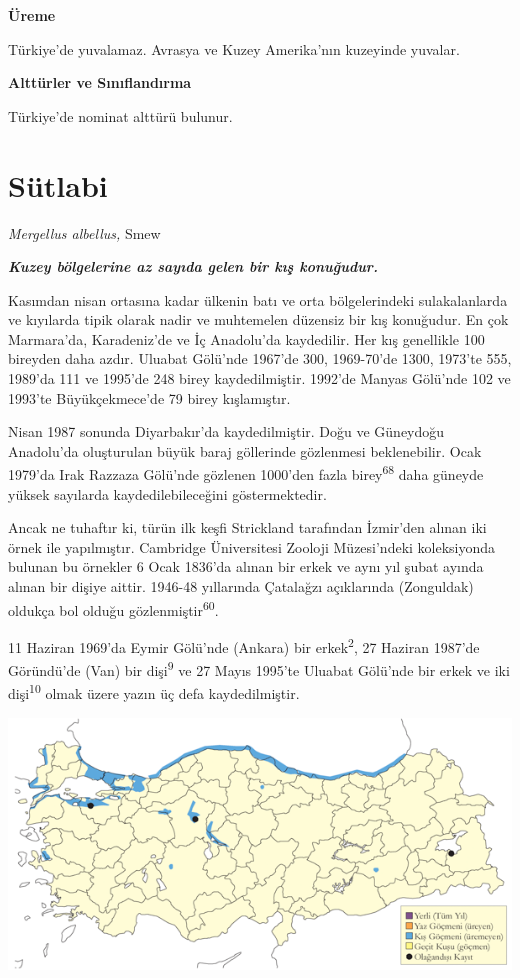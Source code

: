 \documentclass[
  letterpaper,
  DIV=11,
  numbers=noendperiod]{scrreprt}
\begin{document}
\textbf{Üreme}

Türkiye'de yuvalamaz. Avrasya ve Kuzey Amerika'nın kuzeyinde yuvalar.

\textbf{Alttürler ve Sınıflandırma}

Türkiye'de nominat alttürü bulunur.

\section{Sütlabi}\label{suxfctlabi}

\emph{Mergellus albellus,} Smew

\textbf{\emph{Kuzey bölgelerine az sayıda gelen bir kış konuğudur.}}

Kasımdan nisan ortasına kadar ülkenin batı ve orta bölgelerindeki
sulakalanlarda ve kıyılarda tipik olarak nadir ve muhtemelen düzensiz
bir kış konuğudur. En çok Marmara'da, Karadeniz'de ve İç Anadolu'da
kaydedilir. Her kış genellikle 100 bireyden daha azdır. Uluabat Gölü'nde
1967'de 300, 1969-70'de 1300, 1973'te 555, 1989'da 111 ve 1995'de 248
birey kaydedilmiştir. 1992'de Manyas Gölü'nde 102 ve 1993'te
Büyükçekmece'de 79 birey kışlamıştır.

Nisan 1987 sonunda Diyarbakır'da kaydedilmiştir. Doğu ve Güneydoğu
Anadolu'da oluşturulan büyük baraj göllerinde gözlenmesi beklenebilir.
Ocak 1979'da Irak Razzaza Gölü'nde gözlenen 1000'den fazla
birey\textsuperscript{68} daha güneyde yüksek sayılarda
kaydedilebileceğini göstermektedir.

Ancak ne tuhaftır ki, türün ilk keşfi Strickland tarafından İzmir'den
alınan iki örnek ile yapılmıştır. Cambridge Üniversitesi Zooloji
Müzesi'ndeki koleksiyonda bulunan bu örnekler 6 Ocak 1836'da alınan bir
erkek ve aynı yıl şubat ayında alınan bir dişiye aittir. 1946-48
yıllarında Çatalağzı açıklarında (Zonguldak) oldukça bol olduğu
gözlenmiştir\textsuperscript{60}.

11 Haziran 1969'da Eymir Gölü'nde (Ankara) bir erkek\textsuperscript{2},
27 Haziran 1987'de Göründü'de (Van) bir dişi\textsuperscript{9} ve 27
Mayıs 1995'te Uluabat Gölü'nde bir erkek ve iki dişi\textsuperscript{10}
olmak üzere yazın üç defa kaydedilmiştir.

\includegraphics{images/harita_Page_032.png}
\end{document}
